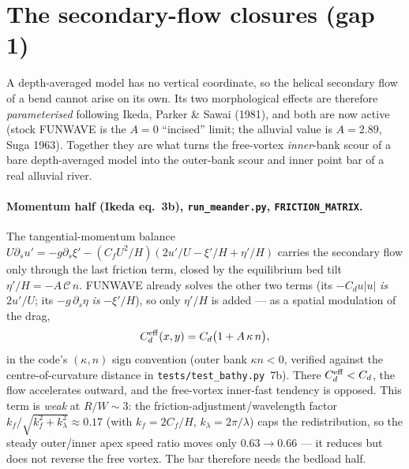 \documentclass[11pt,a4paper]{article}
\newcommand{\ds}{\partial_s}
\newcommand{\code}[1]{\texttt{\small #1}}
\begin{document}
\section{The secondary-flow closures (gap 1)}
\label{sec:secondary}

A depth-averaged model has no vertical coordinate, so the helical secondary flow of a bend
cannot arise on its own. Its two morphological effects are therefore \emph{parameterised}
following Ikeda, Parker \& Sawai (1981), and both are now active (stock FUNWAVE is the $A=0$
``incised'' limit; the alluvial value is $A=2.89$, Suga 1963). Together they are what turns
the free-vortex \emph{inner}-bank scour of a bare depth-averaged model into the outer-bank
scour and inner point bar of a real alluvial river.

\paragraph{Momentum half (Ikeda eq.~3b), \code{run\_meander.py}, \code{FRICTION\_MATRIX}.}
The tangential-momentum balance
$U\ds u' = -g\ds\xi' - (C_fU^2/H)(2u'/U-\xi'/H+\eta'/H)$
carries the secondary flow only through the last friction term, closed by the equilibrium
bed tilt $\eta'/H=-A\,\mathcal C\,n$. FUNWAVE already solves the other two terms (its
$-C_d u|u|$ \emph{is} $2u'/U$; its $-g\,\ds\eta$ \emph{is} $-\xi'/H$), so only $\eta'/H$ is
added --- as a spatial modulation of the drag,
\begin{equation}
  C_d^{\rm eff}(x,y)=C_d\bigl(1+A\,\kappa\,n\bigr),
  \label{eq:cdeff}
\end{equation}
in the code's $(\kappa,n)$ sign convention (outer bank $\kappa n<0$, verified against the
centre-of-curvature distance in \code{tests/test\_bathy.py}~7b). There $C_d^{\rm eff}<C_d$,
the flow accelerates outward, and the free-vortex inner-fast tendency is opposed. This term
is \emph{weak} at $R/W\!\sim\!3$: the friction-adjustment/wavelength factor
$k_f/\sqrt{k_f^2+k_\lambda^2}\approx0.17$ (with $k_f=2C_f/H$, $k_\lambda=2\pi/\lambda$) caps
the redistribution, so the steady outer/inner apex speed ratio moves only
$0.63\!\to\!0.66$ --- it reduces but does not reverse the free vortex. The bar therefore
needs the bedload half.
\end{document}
